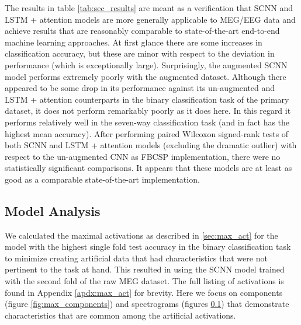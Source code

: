 \documentclass[utf8]{frontiersSCNS} %
\begin{document}
The results in table \ref{tab:sec_results} are meant as a verification that SCNN and LSTM + attention models are more generally applicable to MEG/EEG data and achieve results that are reasonably comparable to state-of-the-art end-to-end machine learning approaches. At first glance there are some increases in classification accuracy, but these are minor with respect to the deviation in performance (which is exceptionally large). Surprisingly, the augmented SCNN model performs extremely poorly with the augmented dataset. Although there appeared to be some drop in its performance against its un-augmented and LSTM + attention counterparts in the binary classification task of the primary dataset, it does not perform remarkably poorly as it does here. In this regard it performs relatively well in the seven-way classification task (and in fact has the highest mean accuracy). After performing paired Wilcoxon signed-rank tests of both SCNN and LSTM + attention models (excluding the dramatic outlier) with respect to the un-augmented CNN as FBCSP implementation, there were no statistically significant comparisons. It appears that these models are at least as good as a comparable state-of-the-art implementation.

\subsection{Model Analysis}

We calculated the maximal activations as described in \ref{sec:max_act} for the model with the highest single fold test accuracy in the binary classification task to minimize creating artificial data that had characteristics that were not pertinent to the task at hand. This resulted in using the SCNN model trained with the second fold of the raw MEG dataset. The full listing of activations is found in Appendix \ref{apdx:max_act} for brevity. Here we focus on components (figure \ref{fig:max_components}) and spectrograms (figures \ref{}) that demonstrate characteristics that are common among the artificial activations.
\end{document}
